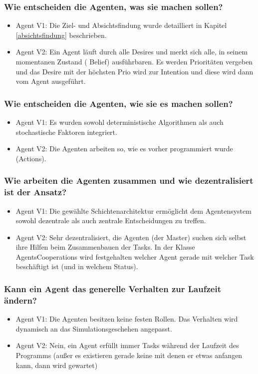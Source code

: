 \documentclass[runningheads]{llncs}
\begin{document}
\subsubsection{Wie entscheiden die Agenten, was sie machen sollen?}
\begin{itemize}
\item Agent V1: Die Ziel- und Absichtsfindung wurde detailliert in Kapitel \ref{absichtsfindung} beschrieben. \\
\item Agent V2: Ein Agent läuft durch alle Desires und merkt sich alle, in seinem momentanen Zustand ( Belief) ausführbaren. Es werden Prioritäten vergeben und das Desire mit der höchsten Prio wird zur Intention und diese wird dann vom Agent ausgeführt.
\end{itemize}

\subsubsection{Wie entscheiden die Agenten, wie sie es machen sollen?}
\begin{itemize}
\item Agent V1: Es wurden sowohl deterministische Algorithmen als auch stochastische Faktoren integriert.
\item Agent V2: Die Agenten arbeiten so, wie es vorher programmiert wurde (Actions).
\end{itemize}

\subsubsection{Wie arbeiten die Agenten zusammen und wie dezentralisiert ist der Ansatz?}
\begin{itemize}
\item Agent V1: Die gewählte Schichtenarchitektur ermöglicht dem Agentensystem sowohl dezentrale als auch zentrale Entscheidungen zu treffen.
\item Agent V2: Sehr dezentralisiert, die Agenten (der Master) suchen sich selbst ihre Hilfen beim Zusammenbauen der Tasks. In der Klasse AgentsCooperations wird festgehalten welcher Agent gerade mit welcher Task beschäftigt ist (und in welchem Status).
\end{itemize}

\subsubsection{Kann ein Agent das generelle Verhalten zur Laufzeit ändern?}
\begin{itemize}
\item Agent V1: Die Agenten besitzen keine festen Rollen. Das Verhalten wird dynamisch an das Simulationsgeschehen angepasst.
\item Agent V2: Nein, ein Agent erfüllt immer Tasks während der Laufzeit des Programms (außer es existieren gerade keine mit denen er etwas anfangen kann, dann wird gewartet)
\end{itemize}
\end{document}
